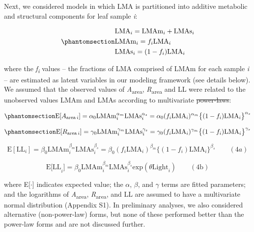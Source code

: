 \documentclass[
  12pt,
  letterpaper,
  DIV=11,
  numbers=noendperiod]{scrartcl}
\providecommand{\DIFadd}[1]{{\protect\color{blue}\uwave{#1}}} %
\providecommand{\DIFdel}[1]{{\protect\color{red}\sout{#1}}}                      %
\providecommand{\DIFaddbegin}{} %
\providecommand{\DIFaddend}{} %
\providecommand{\DIFdelbegin}{} %
\providecommand{\DIFdelend}{} %
\newcommand{\DIFscaledelfig}{0.5}
\newlength{\DIFdelgraphicswidth} %
\newlength{\DIFdelgraphicsheight} %
\newcommand{\DIFaddincludegraphics}[2][]{{\color{blue}\fbox{\DIFOincludegraphics[#1]{#2}}}} %
\newcommand{\DIFdelincludegraphics}[2][]{%
\sbox{\DIFdelgraphicsbox}{\DIFOincludegraphics[#1]{#2}}%
\settoboxwidth{\DIFdelgraphicswidth}{\DIFdelgraphicsbox} %
\settoboxtotalheight{\DIFdelgraphicsheight}{\DIFdelgraphicsbox} %
\scalebox{\DIFscaledelfig}{%
\parbox[b]{\DIFdelgraphicswidth}{\usebox{\DIFdelgraphicsbox}\\[-\baselineskip] \rule{\DIFdelgraphicswidth}{0em}}\llap{\resizebox{\DIFdelgraphicswidth}{\DIFdelgraphicsheight}{%
\setlength{\unitlength}{\DIFdelgraphicswidth}%
\begin{picture}(1,1)%
\thicklines\linethickness{2pt} %
{\color[rgb]{1,0,0}\put(0,0){\framebox(1,1){}}}%
{\color[rgb]{1,0,0}\put(0,0){\line( 1,1){1}}}%
{\color[rgb]{1,0,0}\put(0,1){\line(1,-1){1}}}%
\end{picture}%
}\hspace*{3pt}}} %
} %
\DeclareRobustCommand{\DIFaddbegin}{\DIFOaddbegin \let\includegraphics\DIFaddincludegraphics} %
\DeclareRobustCommand{\DIFaddend}{\DIFOaddend \let\includegraphics\DIFOincludegraphics} %
\DeclareRobustCommand{\DIFdelbegin}{\DIFOdelbegin \let\includegraphics\DIFdelincludegraphics} %
\DeclareRobustCommand{\DIFdelend}{\DIFOaddend \let\includegraphics\DIFOincludegraphics} %
\begin{document}
Next, we considered models in which LMA is partitioned into additive
metabolic and structural components for leaf sample \emph{i}:

\begin{equation}\phantomsection\label{eq-LMA}{
\begin{aligned}
  &\mathrm{LMA}_{i} =\mathrm{LMAm}_{i} + \mathrm{LMAs}_{i} \\
  &\mathrm{LMAm}_{i} = f_{i} \mathrm{LMA}_{i} \\
  &\mathrm{LMAs}_{i} = (1 - f_{i})  \mathrm{LMA}_{i}
\end{aligned}
}\end{equation}

where the \emph{f\textsubscript{i}} values -- the fractions of LMA
comprised of LMAm for each sample \emph{i} -- are estimated as latent
variables in our modeling framework (see details below). We assumed that
the observed values of \emph{A}\textsubscript{area},
\emph{R}\textsubscript{area} and LL were related to the unobserved
values LMAm and LMAs according to multivariate \DIFdelbegin \DIFdel{power-laws}\DIFdelend \DIFaddbegin \DIFadd{power laws}\DIFaddend :

\begin{equation}\phantomsection\label{eq-Aarea}{
\mathrm{E}[A_{\mathrm{area} \, i}]
= \alpha_0\mathrm{LMAm}_{i}^{\alpha_m}\mathrm{LMAs}_i^{\alpha_s}  =  \alpha_0 (f_i \mathrm{LMA}_{i})^{\alpha_m} \bigl\{(1-f_i) \mathrm{LMA}_{i}\bigr\}^{\alpha_s}
}\end{equation}

\begin{equation}\phantomsection\label{eq-Rarea}{
\mathrm{E}[R_{\mathrm{area} \, i}]
= \gamma_0\mathrm{LMAm}_{i}^{\gamma_m} \mathrm{LMAs}_{i}^{\gamma_s}
= \gamma_0 (f_i \mathrm{LMA}_{i})^{\gamma_m} \bigl\{(1-f_i)\mathrm{LMA}_{i}\bigr\}^{\gamma_s}
}\end{equation}

\[
\mathrm{E}[\mathrm{LL}_i] = \beta_0\mathrm{LMAm}_{i}^{\beta_m} \mathrm{LMAs}_{i}^{\beta_s}  = \beta_0 (f_i \mathrm{LMA}_{i})^{\beta_m} \bigl\{(1-f_i) \mathrm{LMA}_{i}\bigr\}^{\beta_s} \qquad(4a)
\]

\[
\mathrm{E[LL}_i] = \beta_0\mathrm{LMAm}_{i}^{\beta_m} \mathrm{LMAs}_{i}^{\beta_s} \mathrm{exp}(\theta \mathrm{Light}_i) \qquad(4\mathrm{b})
\]

where E{[}\(\cdot\){]} indicates expected value; the \(\alpha\),
\(\beta\), and \(\gamma\) terms are fitted parameters; and the
logarithms of \emph{A}\textsubscript{area},
\emph{R}\textsubscript{area}, and LL are assumed to have a multivariate
normal distribution (Appendix S1). In preliminary analyses, we also
considered alternative (non-power-law) forms, but none of these
performed better than the power-law forms and are not discussed further.
\end{document}
